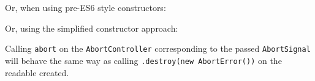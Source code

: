 Or, when using pre-ES6 style constructors:

\begin{Shaded}
\begin{Highlighting}[]
\OperatorTok{=} \NormalTok{(}\NormalTok{)}\OperatorTok{;}
\OperatorTok{=} \NormalTok{(}\NormalTok{)}\OperatorTok{;}

 
  \NormalTok{ (}\OperatorTok{!}\NormalTok{(} 
      \OperatorTok{;}
\NormalTok{(}\OperatorTok{,}\OperatorTok{;}
\NormalTok{\}}
\OperatorTok{,}\OperatorTok{;}
\end{Highlighting}
\end{Shaded}

Or, using the simplified constructor approach:

\begin{Shaded}
\begin{Highlighting}[]
\OperatorTok{=} \NormalTok{(}\NormalTok{)}\OperatorTok{;}

\OperatorTok{=}  \NormalTok{(\{}
\NormalTok{  \}}\OperatorTok{,}
\NormalTok{\})}\OperatorTok{;}
\end{Highlighting}
\end{Shaded}

Calling \texttt{abort} on the \texttt{AbortController} corresponding to
the passed \texttt{AbortSignal} will behave the same way as calling
\texttt{.destroy(new\ AbortError())} on the readable created.

